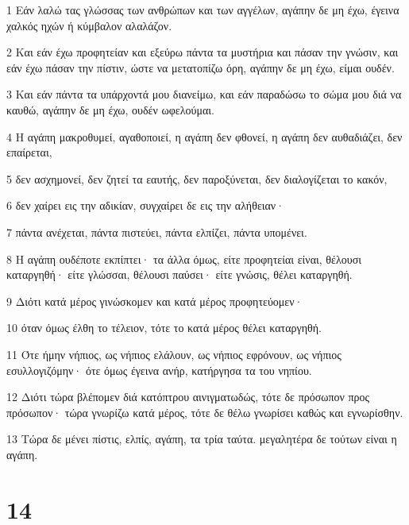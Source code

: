 \par 1 Εάν λαλώ τας γλώσσας των ανθρώπων και των αγγέλων, αγάπην δε μη έχω, έγεινα χαλκός ηχών ή κύμβαλον αλαλάζον.
\par 2 Και εάν έχω προφητείαν και εξεύρω πάντα τα μυστήρια και πάσαν την γνώσιν, και εάν έχω πάσαν την πίστιν, ώστε να μετατοπίζω όρη, αγάπην δε μη έχω, είμαι ουδέν.
\par 3 Και εάν πάντα τα υπάρχοντά μου διανείμω, και εάν παραδώσω το σώμα μου διά να καυθώ, αγάπην δε μη έχω, ουδέν ωφελούμαι.
\par 4 Η αγάπη μακροθυμεί, αγαθοποιεί, η αγάπη δεν φθονεί, η αγάπη δεν αυθαδιάζει, δεν επαίρεται,
\par 5 δεν ασχημονεί, δεν ζητεί τα εαυτής, δεν παροξύνεται, δεν διαλογίζεται το κακόν,
\par 6 δεν χαίρει εις την αδικίαν, συγχαίρει δε εις την αλήθειαν·
\par 7 πάντα ανέχεται, πάντα πιστεύει, πάντα ελπίζει, πάντα υπομένει.
\par 8 Η αγάπη ουδέποτε εκπίπτει· τα άλλα όμως, είτε προφητείαι είναι, θέλουσι καταργηθή· είτε γλώσσαι, θέλουσι παύσει· είτε γνώσις, θέλει καταργηθή.
\par 9 Διότι κατά μέρος γινώσκομεν και κατά μέρος προφητεύομεν·
\par 10 όταν όμως έλθη το τέλειον, τότε το κατά μέρος θέλει καταργηθή.
\par 11 Ότε ήμην νήπιος, ως νήπιος ελάλουν, ως νήπιος εφρόνουν, ως νήπιος εσυλλογιζόμην· ότε όμως έγεινα ανήρ, κατήργησα τα του νηπίου.
\par 12 Διότι τώρα βλέπομεν διά κατόπτρου αινιγματωδώς, τότε δε πρόσωπον προς πρόσωπον· τώρα γνωρίζω κατά μέρος, τότε δε θέλω γνωρίσει καθώς και εγνωρίσθην.
\par 13 Τώρα δε μένει πίστις, ελπίς, αγάπη, τα τρία ταύτα. μεγαλητέρα δε τούτων είναι η αγάπη.

\chapter{14}

